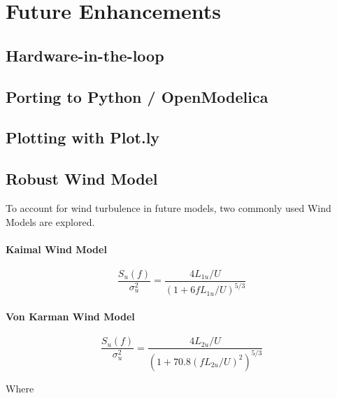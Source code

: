 \documentclass[]{article}
\let\oldparagraph\paragraph
\renewcommand{\paragraph}[1]{\oldparagraph{#1}\mbox{}}
\begin{document}
\clearpage

\section{Future Enhancements}\label{future-enhancements}

\subsection{Hardware-in-the-loop}\label{hardware-in-the-loop}

\subsection{Porting to Python /
OpenModelica}\label{porting-to-python-openmodelica}

\subsection{Plotting with Plot.ly}\label{plotting-with-plot.ly}

\subsection{Robust Wind Model}\label{robust-wind-model}

To account for wind turbulence in future models, two commonly used Wind
Models are explored.

\paragraph{Kaimal Wind Model}\label{kaimal-wind-model}

\begin{equation}
\label{eq_kaiman_wind_model}
\dfrac{S_u (f)}{\sigma ^2 _ u} = \dfrac{4 L_{1u} / U }{(1+6f L_{1u} / U )^{5/3}}
\end{equation}

\paragraph{Von Karman Wind Model}\label{von-karman-wind-model}

\begin{equation}
\label{eq_von_karman_wind_model}
\dfrac{S_u (f)}{\sigma ^2 _ u} = \dfrac{4 L_{2u} / U }{(1+ 70.8 (fL_{2u} / U)^2 )^{5/3}}
\end{equation}

Where
\end{document}
